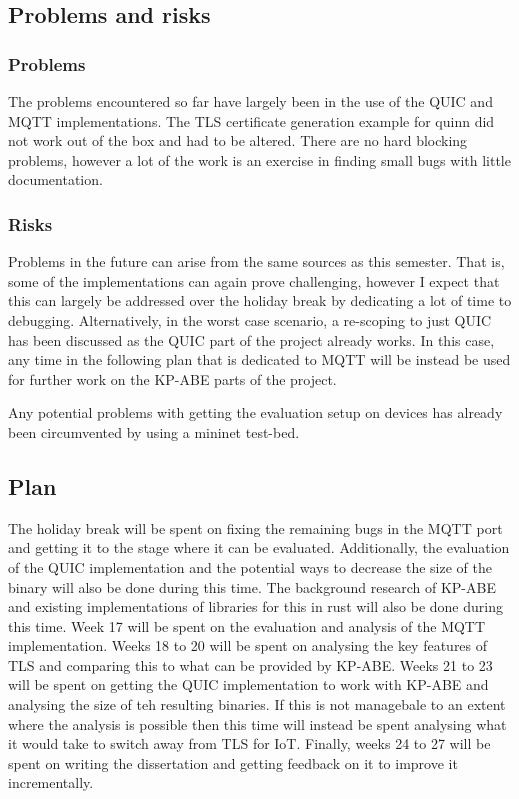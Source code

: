 \documentclass[11pt]{article}
\begin{document}
\subsection{Problems and risks}\label{problems-and-risks}

\subsubsection{Problems}\label{problems}

The problems encountered so far have largely been in the use of the QUIC and MQTT implementations.
The TLS certificate generation example for quinn did not work out of the box and had to be altered.
There are no hard blocking problems, however a lot of the work is an exercise in finding small bugs with little documentation.

\subsubsection{Risks}\label{risks}

Problems in the future can arise from the same sources as this semester.
That is, some of the implementations can again prove challenging, however I expect that this can largely be addressed over the holiday break by dedicating a lot of time to debugging.
Alternatively, in the worst case scenario, a re-scoping to just QUIC has been discussed as the QUIC part of the project already works.
In this case, any time in the following plan that is dedicated to MQTT will be instead be used for further work on the KP-ABE parts of the project.

Any potential problems with getting the evaluation setup on devices has already been circumvented by using a mininet test-bed.

\subsection{Plan}\label{plan}

The holiday break will be spent on fixing the remaining bugs in the MQTT port and getting it to the stage where it can be evaluated.
Additionally, the evaluation of the QUIC implementation and the potential ways to decrease the size of the binary will also be done during this time.
The background research of KP-ABE and existing implementations of libraries for this in rust will also be done during this time.
Week 17 will be spent on the evaluation and analysis of the MQTT implementation.
Weeks 18 to 20 will be spent on analysing the key features of TLS and comparing this to what can be provided by KP-ABE.
Weeks 21 to 23 will be spent on getting the QUIC implementation to work with KP-ABE and analysing the size of teh resulting binaries. 
If this is not managebale to an extent where the analysis is possible then this time will instead be spent analysing what it would take to switch away from TLS for IoT.
Finally, weeks 24 to 27 will be spent on writing the dissertation and getting feedback on it to improve it incrementally.

\medskip

    
    
\end{document}
